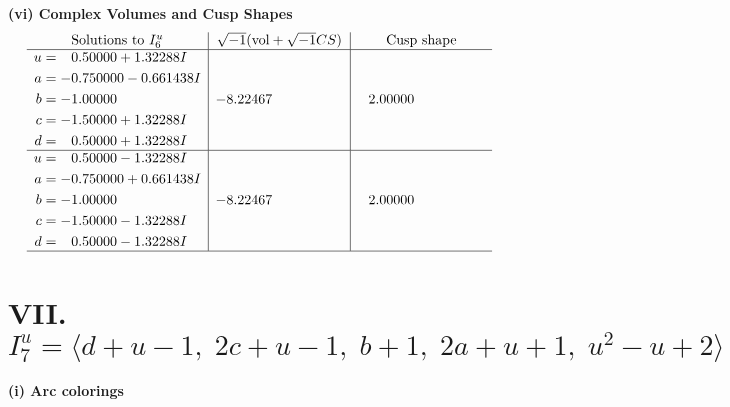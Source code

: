 \documentclass[1p]{elsarticle_modified}
\theoremstyle{definition}
\newcommand{\I}{\sqrt{-1}}
\begin{document}
\newpage\flushleft \textbf{(vi) Complex Volumes and Cusp Shapes}
$$\begin{array}{c|c|c}  
\text{Solutions to }I^u_{6}& \I (\text{vol} + \sqrt{-1}CS) & \text{Cusp shape}\\
 \hline 
\begin{aligned}
u &= \phantom{-}0.50000 + 1.32288 I \\
a &= -0.750000 - 0.661438 I \\
b &= -1.00000\phantom{ +0.000000I} \\
c &= -1.50000 + 1.32288 I \\
d &= \phantom{-}0.50000 + 1.32288 I\end{aligned}
 & -8.22467\phantom{ +0.000000I} & \phantom{-}2.00000\phantom{ +0.000000I} \\ \hline\begin{aligned}
u &= \phantom{-}0.50000 - 1.32288 I \\
a &= -0.750000 + 0.661438 I \\
b &= -1.00000\phantom{ +0.000000I} \\
c &= -1.50000 - 1.32288 I \\
d &= \phantom{-}0.50000 - 1.32288 I\end{aligned}
 & -8.22467\phantom{ +0.000000I} & \phantom{-}2.00000\phantom{ +0.000000I}\\
 \hline 
 \end{array}$$\newpage\newpage\renewcommand{\arraystretch}{1}
\centering \section*{VII. $I^u_{7}= \langle d+u-1,\;2 c+u-1,\;b+1,\;2 a+u+1,\;u^2- u+2 \rangle$}
\flushleft \textbf{(i) Arc colorings}\\
\end{document}
